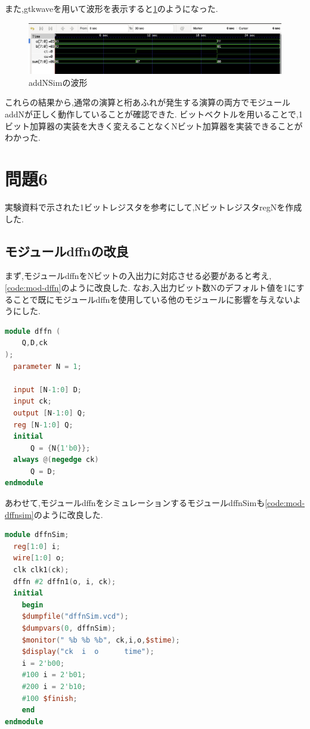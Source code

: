 \documentclass[autodetect-engine, dvi=dvipdfmx, 10pt, a4paper, ja=standard]{bxjsarticle}
\begin{document}
また,gtkwaveを用いて波形を表示すると\ref{fig:ex5}のようになった.

\begin{figure}[H]
	\centering
	\includegraphics[width=\textwidth]{ex5.png}
	\caption{addNSimの波形}
	\label{fig:ex5}
\end{figure}

これらの結果から,通常の演算と桁あふれが発生する演算の両方でモジュールaddNが正しく動作していることが確認できた.
ビットベクトルを用いることで,1ビット加算器の実装を大きく変えることなくNビット加算器を実装できることがわかった.

\section{問題6}
\label{sec:ex-6}

実験資料で示された1ビットレジスタを参考にして,NビットレジスタregNを作成した.

\subsection{モジュールdffnの改良}

まず,モジュールdffnをNビットの入出力に対応させる必要があると考え,\ref{code:mod-dffn}のように改良した.
なお,入出力ビット数Nのデフォルト値を1にすることで既にモジュールdffnを使用している他のモジュールに影響を与えないようにした.

\begin{lstlisting}[language={Verilog}, caption={改良後のモジュールdffnのVerilogコード}, label={code:mod-dffn}]
module dffn (
    Q,D,ck
);
  parameter N = 1;

  input [N-1:0] D;
  input ck;
  output [N-1:0] Q;
  reg [N-1:0] Q;
  initial
      Q = {N{1'b0}};
  always @(negedge ck)
      Q = D;
endmodule
\end{lstlisting}

あわせて,モジュールdffnをシミュレーションするモジュールdffnSimも\ref{code:mod-dffnsim}のように改良した.

\begin{lstlisting}[language={Verilog}, caption={改良後のモジュールdffnSimのVerilogコード}, label={code:mod-dffnsim}]
module dffnSim;
  reg[1:0] i;
  wire[1:0] o;
  clk clk1(ck);
  dffn #2 dffn1(o, i, ck);
  initial
    begin
    $dumpfile("dffnSim.vcd");
    $dumpvars(0, dffnSim);
    $monitor(" %b %b %b", ck,i,o,$stime);
    $display("ck  i  o      time");
    i = 2'b00;
    #100 i = 2'b01;
    #200 i = 2'b10;
    #100 $finish;
    end
endmodule
\end{lstlisting}
\end{document}
